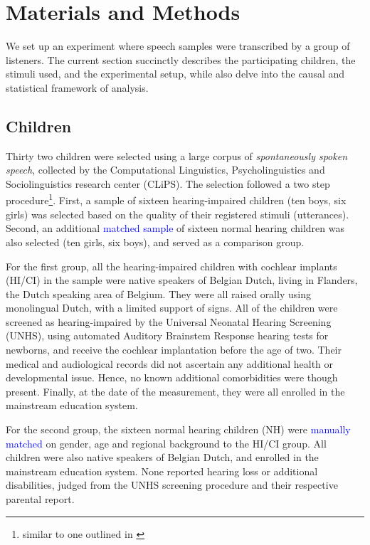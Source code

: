 \section{Materials and Methods}
%
We set up an experiment where speech samples were transcribed by a group of listeners. The current section succinctly describes the participating children, the stimuli used, and the experimental setup, while also delve into the causal and statistical framework of analysis.
%
%
\subsection{Children}
%
Thirty two children were selected using a large corpus of \textit{spontaneously spoken speech}, collected by the Computational Linguistics, Psycholinguistics and Sociolinguistics research center (CLiPS). The selection followed a two step procedure\footnote{similar to one outlined in \citet{Faes_et_al_2021}}. First, a sample of sixteen hearing-impaired children (ten boys, six girls) was selected based on the quality of their registered stimuli (utterances). Second, an additional \textcolor{blue}{matched sample} of sixteen normal hearing children was also selected (ten girls, six boys), and served as a comparison group.

For the first group, all the hearing-impaired children with cochlear implants (HI/CI) in the sample were native speakers of Belgian Dutch, living in Flanders, the Dutch speaking area of Belgium. They were all raised orally using monolingual Dutch, with a limited support of signs. All of the children were screened as hearing-impaired by the Universal Neonatal Hearing Screening (UNHS), using automated Auditory Brainstem Response hearing tests for newborns, and receive the cochlear implantation before the age of two. Their medical and audiological records did not ascertain any additional health or developmental issue. Hence, no known additional comorbidities were though present. Finally, at the date of the measurement, they were all enrolled in the mainstream education system.

For the second group, the sixteen normal hearing children (NH) were \textcolor{blue}{manually matched} on gender, age and regional background to the HI/CI group. All children were also native speakers of Belgian Dutch, and enrolled in the mainstream education system. None reported hearing loss or additional disabilities, judged from the UNHS screening procedure and their respective parental report.

